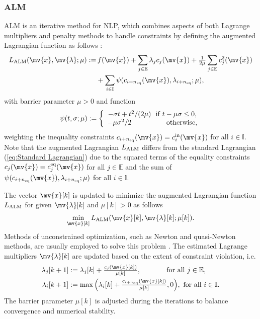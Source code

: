 \documentclass[journal]{IEEEtranTIE}
\begin{document}
\subsubsection{ALM}
ALM is an iterative method for NLP, which combines aspects of both Lagrange multipliers and penalty methods to handle constraints by defining the augmented Lagrangian function as follows \cite{jorge2006numerical}:
\begin{align}
\begin{split}\label{eq:ALM}
L_{\rm ALM}(\mv{x},\mv{\lambda};\mu) :=&\, f(\mv{x}) + \sum\limits_{j \in \mathbb{E}} {{\lambda _j}{c_j}(\mv{x})}  + \tfrac{1}{{2\mu }}\sum\limits_{j \in \mathbb{E}} {c_j^2(\mv{x})} \\
&+ \sum\limits_{i \in \mathbb{I}} \psi(c_{i+n_{\rm eq}}(\mv{x}),\lambda_{i+n_{\rm eq}};\mu),
\end{split}
\end{align}
%
with barrier parameter $\mu>0$ and function
%
\begin{align}
\psi (t,\sigma;\mu) := \left\{ {\begin{array}{*{20}{c}}
{ - \sigma t + {t^2}/(2\mu)\,\,\,\,{\rm{if}}\;t - \mu \sigma \le 0,}\\
{ - \mu{\sigma^2}/2\;\;\;\;\;\;\;\;\;\;\;\;\;\;\;\;\;\;{\rm{otherwise}}{\rm{,}}}
\end{array}} \right.
\end{align}
%
weighting the inequality constraints $c_{i+n_{\rm eq}}(\mv{x}) = c^{\rm in}_i(\mv{x})$ for all $i \in \mathbb{I}$.
Note that the augmented Lagrangian $L_{\rm ALM}$ differs from the standard Lagrangian (\ref{eq:Standard Lagrangian}) due to the squared terms of the equality constraints $c_j(\mv{x}) = c^{\rm eq}_j(\mv{x})$ for all $j \in \mathbb{E}$ and the sum of $\psi(c_{i+n_{\rm eq}}(\mv{x}),\lambda_{i+n_{\rm eq}};\mu)$ for all $i \in \mathbb{I}$.

The vector $\mv{x}[k]$ is updated to minimize the augmented Lagrangian function ${L_{\rm ALM}}$ for given $\mv{\lambda}[k]$ and $\mu[k]>0$ as follows
\begin{align}\label{eq:min_La}
\mathop {\min }\limits_{\mv{x}[k]} {L_{\rm ALM}}(\mv{x}[k],\mv{\lambda}[k];{\mu[k]}).
\end{align}
Methods of unconstrained optimization, such as Newton and quasi-Newton methods, are usually employed to solve this problem \cite{srivastava2020nesterov}. The estimated Lagrange multipliers $\mv{\lambda}[k]$ are updated based on the extent of constraint violation, i.e.
%
\begin{subequations}\label{eq:ALM_update}
\begin{align}
\lambda_j[k + 1] &:= \lambda_j[k] + \tfrac{c_j(\mv{x}[k])}{\mu[k]},\ \ \ \ \ \ \ \ \ \ \ {\rm{for\ all\ }} j \in \mathbb{E},\\
\lambda_i[k + 1] &:= \max \Big(\lambda_i[k] + \tfrac{c_{i+n_{\rm eq}}(\mv{x}[k])}{\mu[k]},0\Big),\ {\rm{for\ all\ }} i \in \mathbb{I}.
\end{align}
\end{subequations}
%
The barrier parameter $\mu[k]$ is adjusted during the iterations to balance convergence and numerical stability. 
\end{document}
